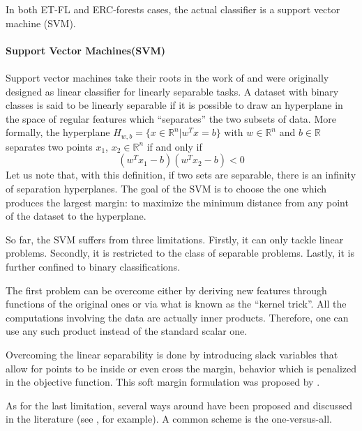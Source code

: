 \documentclass[a4paper]{report}
\newlength{\larg}
\begin{document}
		In both ET-FL and ERC-forests cases, the actual classifier is a support vector machine (SVM).
		\begin{leftbar}
			\paragraph{Support Vector Machines(SVM)}
			\paragraph{}
			Support vector machines take their roots in the work of \cite{svm} and were originally designed as linear classifier for linearly separable tasks. A dataset with binary classes is said to be linearly separable if it is possible to draw an hyperplane in the space of regular features which ``separates'' the two subsets of data.
			More formally, the hyperplane $H_{w,b} = \{x \in \mathbb{R}^n | w^T x = b\}$ with $w \in \mathbb{R}^n$ and $b \in \mathbb{R}$ separates two points $x_1$, $x_2 \in \mathbb{R}^n$ if and only if 
			\[
				(w^T x_1 - b)(w^T x_2 - b) < 0
			\] 
			Let us note that, with this definition, if two sets are separable, there is an infinity of separation hyperplanes. The goal of the SVM is to choose the one which produces the largest margin: to maximize the minimum distance from any point of the dataset to the hyperplane.
			\par
			So far, the SVM suffers from three limitations. Firstly, it can only tackle linear problems. Secondly, it is restricted to the class of separable problems. Lastly, it is further confined to binary classifications. 
			\par
			The first problem can be overcome either by deriving new features through functions of the original ones or via what is known as the ``kernel trick''. All the computations involving the data are actually inner products. Therefore, one can use any such product instead of the standard scalar one. 
			\par
			Overcoming the linear separability is done by introducing slack variables that allow for points to be inside or even cross the margin, behavior which is penalized in the objective function. This soft margin formulation was proposed by \cite{svmsoft}.
			\par
			As for the last limitation, several ways around have been proposed and discussed in the literature (see \cite{svmmulticlass}, for example). A common scheme is the one-versus-all. 
		\end{leftbar}
\end{document}
